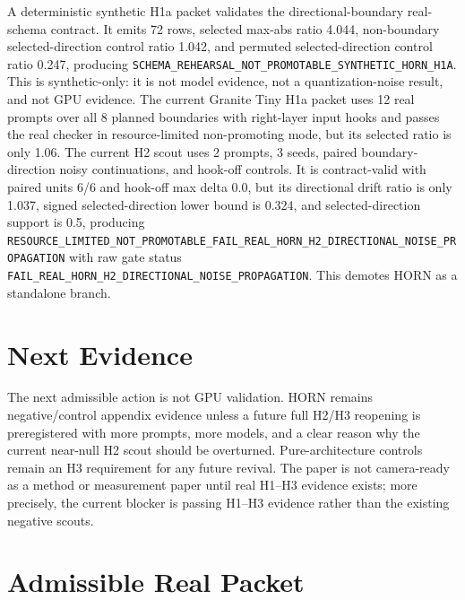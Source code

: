 \documentclass{article}
\begin{document}
A deterministic synthetic H1a packet validates the directional-boundary
real-schema contract. It emits 72 rows, selected max-abs ratio 4.044,
non-boundary selected-direction control ratio 1.042, and permuted
selected-direction control ratio 0.247, producing
\texttt{SCHEMA\_REHEARSAL\_NOT\_PROMOTABLE\_SYNTHETIC\_HORN\_H1A}. This is
synthetic-only: it is not model evidence, not a quantization-noise result, and
not GPU evidence.
The current Granite Tiny H1a packet uses 12 real prompts over all 8 planned
boundaries with right-layer input hooks and passes the real checker in
resource-limited non-promoting mode, but its selected ratio is only 1.06. The
current H2 scout uses 2 prompts, 3 seeds, paired boundary-direction noisy
continuations, and hook-off controls. It is contract-valid with paired units
6/6 and hook-off max delta 0.0, but its directional drift ratio is only 1.037,
signed selected-direction lower bound is 0.324, and selected-direction support
is 0.5,
producing
\texttt{RESOURCE\_LIMITED\_NOT\_PROMOTABLE\_FAIL\_REAL\_HORN\_H2\_DIRECTIONAL\_NOISE\_PROPAGATION}
with raw gate status
\texttt{FAIL\_REAL\_HORN\_H2\_DIRECTIONAL\_NOISE\_PROPAGATION}. This demotes
HORN as a standalone branch.

\section{Next Evidence}

The next admissible action is not GPU validation. HORN remains negative/control
appendix evidence unless a future full H2/H3 reopening is
preregistered with more prompts, more models, and a clear reason why the current
near-null H2 scout should be overturned. Pure-architecture controls remain an
H3 requirement for any future revival.
The paper is not camera-ready as a method or measurement paper until real H1--H3 evidence exists; more precisely, the current blocker is passing H1--H3 evidence rather than the existing negative scouts.

\section{Admissible Real Packet}
\end{document}
